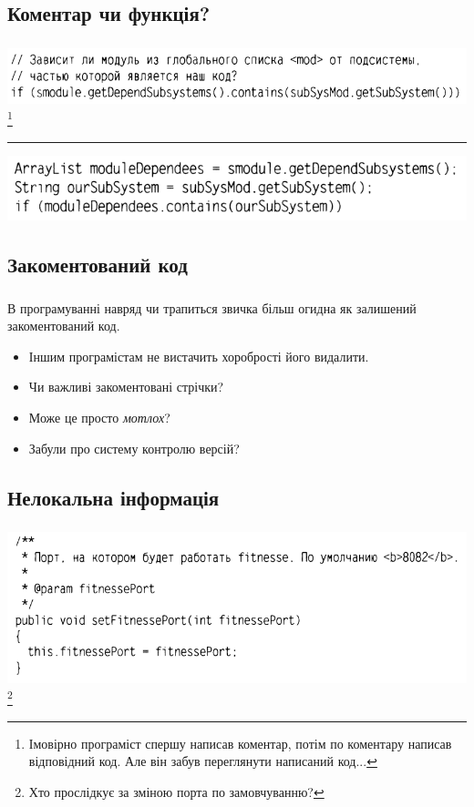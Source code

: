 \documentclass[12pt,pdf,utf8,ukrainian,aspectratio=169]{beamer}
\makeatletter
\newcommand*{\currentname}{\@currentlabelname}
\makeatother
\begin{document}
	\subsection{Коментар чи функція?}
	\begin{frame}\frametitle{\currentname}
		\includegraphics[scale=0.6]{clean_code_16.png}
		\footnote{Імовірно програміст спершу написав коментар, потім по коментару написав відповідний код. Але він забув переглянути написаний код...}
		\hfill	
		\vfill	
		\noindent\rule{\textwidth}{1pt}
		\vfill
		\includegraphics[scale=0.6]{clean_code_16_1.png}
		\hfill
	\end{frame}

	\subsection{Закоментований код}
	\begin{frame}\frametitle{\currentname}
		\begin{block}
			{\LARGE В програмуванні навряд чи трапиться звичка більш огидна як залишений закоментований код. }
		\end{block}
		\begin{itemize}
			\item Іншим програмістам не вистачить хоробрості його видалити.
			\item Чи важливі закоментовані стрічки?
			\item Може це просто \textit{мотлох}?
			\item Забули про систему контролю версій?
		\end{itemize}
	\end{frame}

	\subsection{Нелокальна інформація}
	\begin{frame}\frametitle{\currentname}
		\includegraphics[scale=0.6]{clean_code_17.png}
		\footnote{Хто прослідкує за зміною порта по замовчуванню?}
		\hfill	
	\end{frame}
\end{document}
